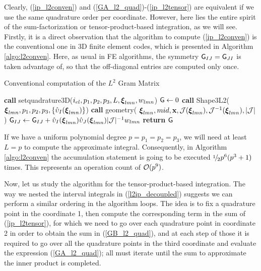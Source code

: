 Clearly, (\ref{ip_l2conven}) and (\ref{GA_l2_quad})-(\ref{ip_l2tensor}) are equivalent if we use the same quadrature order per coordinate. However, here lies the entire spirit of the sum-factorization or tensor-product-based integration, as we will see. Firstly, it is a direct observation that the algorithm to compute (\ref{ip_l2conven}) is the conventional one in 3D finite element codes, which is presented in Algorithm \ref{algo:l2conven}. Here, as usual in FE algorithms, the symmetry $\mathsf{G}_{IJ}=\mathsf{G}_{JI}$ is taken advantage of, so that the off-diagonal entries are computed only once.
% 
\begin{algorithm}[ht]
\caption{Conventional computation of the $L^2$ Gram Matrix}\label{algo:l2conven}
\begin{algorithmic}
\State\textbf{call }setquadrature3D($i_{el},p_1,p_2,p_3,L,\boldsymbol{\xi}_{lmn},w_{lmn}$)
\State $\mathsf{G}\gets 0$
            \State\textbf{call } Shape3L2($\boldsymbol{\xi}_{lmn},p_1,p_2,p_3,\{\hat{\upsilon}_I(\boldsymbol{\xi}_{lmn})\}$)
            \State\textbf{call } geometry( $\boldsymbol{\xi}_{lmn},mid,\mathbf{x},\mathcal{J}(\boldsymbol{\xi}_{lmn}),\mathcal{J}^{-1}(\boldsymbol{\xi}_{lmn}),|\mathcal{J}|$)
                    \State $\mathsf{G}_{IJ}\gets \mathsf{G}_{IJ}+\hat{\upsilon}_I(\boldsymbol{\xi}_{lmn})\hat{\upsilon}_J(\boldsymbol{\xi}_{lmn})|\mathcal{J}|^{-1}w_{lmn}$ 
                \EndFor
            \EndFor        
\EndFor
\State \textbf{return} $\mathsf{G}$
\EndProcedure
\end{algorithmic}
\end{algorithm}

If we have a uniform polynomial degree $p=p_1=p_2=p_3$, we will need at least $L=p$ to compute the approximate integral. Consequently, in Algorithm \ref{algo:l2conven} the accumulation statement is going to be executed $\onehalf p^6(p^3+1)$ times. This represents an operation count of $\mathcal{O}(p^9)$.

Now, let us study the algorithm for the tensor-product-based integration. The way we nested the interval integrals in (\ref{l2ip_decoupled}) suggests we can perform a similar ordering in the algorithm loops. The idea is to fix a quadrature point in the coordinate 1, then compute the corresponding term in the sum of (\ref{ip_l2tensor}), for which we need to go over each quadrature point in coordinate 2 in order to obtain the sum in (\ref{GB_l2_quad}), and at each step of those it is required to go over all the quadrature points in the third coordinate and evaluate the expression (\ref{GA_l2_quad}); all must iterate until the sum to approximate the inner product is completed.

